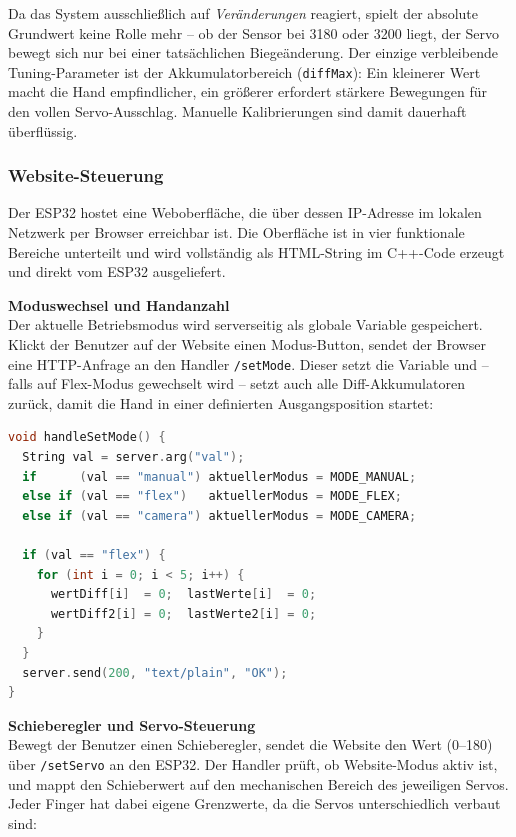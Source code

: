 \documentclass[12pt,a4paper]{article}
\begin{document}
Da das System ausschließlich auf \textit{Veränderungen} reagiert, spielt der absolute Grundwert keine Rolle mehr -- ob der Sensor bei 3180 oder 3200 liegt, der Servo bewegt sich nur bei einer tatsächlichen Biegeänderung. Der einzige verbleibende Tuning-Parameter ist der Akkumulatorbereich (\texttt{diffMax}): Ein kleinerer Wert macht die Hand empfindlicher, ein größerer erfordert stärkere Bewegungen für den vollen Servo-Ausschlag. Manuelle Kalibrierungen sind damit dauerhaft überflüssig.

\newpage

\subsubsection{Website-Steuerung}

Der ESP32 hostet eine Weboberfläche, die über dessen IP-Adresse im lokalen Netzwerk per Browser erreichbar ist. Die Oberfläche ist in vier funktionale Bereiche unterteilt und wird vollständig als HTML-String im C++-Code erzeugt und direkt vom ESP32 ausgeliefert.

\vspace{0.5em}
\textbf{Moduswechsel und Handanzahl} \\
Der aktuelle Betriebsmodus wird serverseitig als globale Variable gespeichert. Klickt der Benutzer auf der Website einen Modus-Button, sendet der Browser eine HTTP-Anfrage an den Handler \texttt{/setMode}. Dieser setzt die Variable und -- falls auf Flex-Modus gewechselt wird -- setzt auch alle Diff-Akkumulatoren zurück, damit die Hand in einer definierten Ausgangsposition startet:

\begin{lstlisting}[language=C++, caption={Handler: Moduswechsel und Reset der Diff-Akkumulatoren}]
void handleSetMode() {
  String val = server.arg("val");
  if      (val == "manual") aktuellerModus = MODE_MANUAL;
  else if (val == "flex")   aktuellerModus = MODE_FLEX;
  else if (val == "camera") aktuellerModus = MODE_CAMERA;

  if (val == "flex") {
    for (int i = 0; i < 5; i++) {
      wertDiff[i]  = 0;  lastWerte[i]  = 0;
      wertDiff2[i] = 0;  lastWerte2[i] = 0;
    }
  }
  server.send(200, "text/plain", "OK");
}
\end{lstlisting}

\vspace{0.5em}
\textbf{Schieberegler und Servo-Steuerung} \\
Bewegt der Benutzer einen Schieberegler, sendet die Website den Wert (0--180) über \texttt{/setServo} an den ESP32. Der Handler prüft, ob Website-Modus aktiv ist, und mappt den Schieberwert auf den mechanischen Bereich des jeweiligen Servos. Jeder Finger hat dabei eigene Grenzwerte, da die Servos unterschiedlich verbaut sind:
\end{document}
